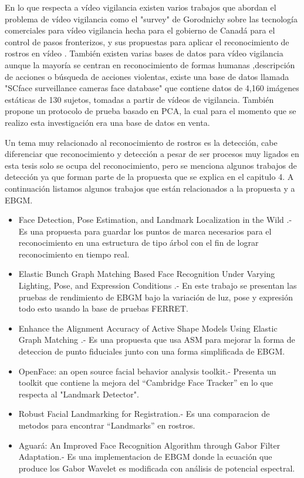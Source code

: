 En lo que respecta a vídeo vigilancia existen varios trabajos que abordan el problema de vídeo vigilancia como el "survey" de Gorodnichy sobre las tecnología comerciales para vídeo vigilancia \cite{gorodnichy2014survey} hecha para el gobierno de Canadá para el control de pasos fronterizos, y sus propuestas para aplicar el reconocimiento de rostros en vídeo \cite{gorodnichy2005video}. También existen varias bases de datos para vídeo vigilancia aunque la mayoría se centran en reconocimiento de formas humanas ,descripción de acciones o búsqueda de acciones violentas, existe una base de datos llamada "SCface surveillance cameras face database" \cite{grgic2011scface} que contiene datos de 4,160 imágenes estáticas de 130 sujetos, tomadas a partir de vídeos de vigilancia. También propone un protocolo de prueba basado en \ac{PCA}, la cual para el momento que se realizo esta investigación era una base de datos en venta.

Un tema muy relacionado al reconocimiento de rostros es la detección, cabe diferenciar que reconocimiento y detección a pesar de ser procesos muy ligados en esta tesis solo se ocupa del reconocimiento, pero se menciona algunos trabajos de detección ya que forman parte de la propuesta que se explica en el capitulo 4. A continuación listamos algunos trabajos que están relacionados a la propuesta y a \ac{EBGM}.

\begin{itemize}
\item Face Detection, Pose Estimation, and Landmark Localization in the Wild \cite{zhu2012face}.- Es una propuesta para guardar los puntos de marca necesarios para el reconocimiento en una estructura de tipo árbol con
el fin de lograr reconocimiento en tiempo real.
\item Elastic Bunch Graph Matching Based Face Recognition Under Varying Lighting, Pose, and Expression Conditions \cite{bhat2015elastic}.- En este trabajo se presentan las pruebas de rendimiento de \ac{EBGM} bajo la
variación de luz, pose y expresión todo esto usando la base de pruebas FERRET.
\item Enhance the Alignment Accuracy of Active Shape Models Using Elastic Graph Matching \cite{zhao2004enhance}.- Es una propuesta que usa \ac{ASM} para mejorar la forma de deteccion de punto fiduciales junto con una forma simplificada de \ac{EBGM}.
\item OpenFace: an open source facial behavior analysis toolkit\cite{Baltrusaitis2016}.- Presenta un toolkit que contiene la mejora del ``Cambridge Face Tracker'' en lo que respecta al "Landmark Detector".
\item Robust Facial Landmarking for Registration\cite{salah2007robust}.- Es una comparacion de metodos para encontrar ``Landmarks'' en rostros.
\item Aguará: An Improved Face Recognition Algorithm through Gabor Filter Adaptation\cite{aguerrebere2007aguara}.- Es una implementacion de \ac{EBGM} donde la ecuación que produce los Gabor Wavelet es modificada con análisis de potencial espectral.
\end{itemize}
